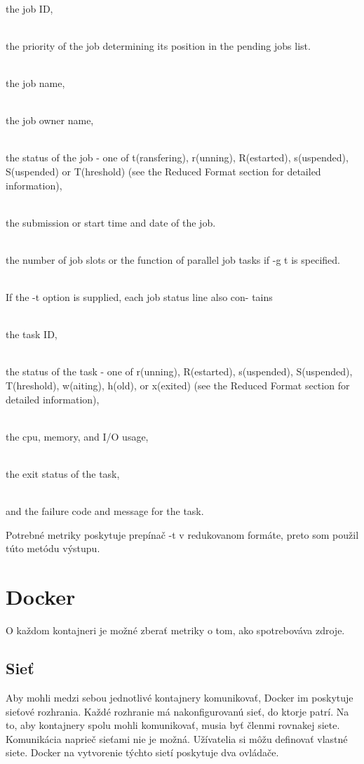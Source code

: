 \documentclass[11pt,final,oneside]{fithesis}
\begin{document}
\begin{description}
     \\  the job ID,

     \\  the priority of the job determining its position  in  the
        pending  jobs  list.  

     \\  the job name,

     \\  the job owner name,

     \\  the status of the job - one of t(ransfering),  r(unning),
        R(estarted), s(uspended), S(uspended) or T(hreshold) (see
        the Reduced Format section for detailed information),

     \\  the submission or start time and date of the job.

     \\  the number of job slots or the function of  parallel  job
        tasks if -g t is specified.


     \\If the -t option is supplied, each job status line also con-
     tains

     \\  the task ID,

     \\  the status of the task - one of  r(unning),  R(estarted),
        s(uspended), S(uspended), T(hreshold), w(aiting), h(old),
        or x(exited) (see the Reduced Format section for detailed
        information),

     \\  the cpu, memory, and I/O usage,

     \\  the exit status of the task,

     \\  and the failure code and message for the task.

\end{description}
 
Potrebné metriky poskytuje prepínač -t v redukovanom formáte, preto som použil túto metódu výstupu.

\section{Docker}
O každom kontajneri je možné zberať metriky o tom, ako spotrebováva zdroje.
\subsection{Sieť}
Aby mohli medzi sebou jednotlivé kontajnery komunikovať, Docker im poskytuje sieťové rozhrania. Každé rozhranie má nakonfigurovanú sieť,
do ktorje patrí. Na to, aby kontajnery spolu mohli komunikovať, musia byť členmi rovnakej siete. Komunikácia naprieč sieťami nie je možná.
Užívatelia si môžu definovať vlastné siete. Docker na vytvorenie týchto sietí poskytuje dva ovládače.
\end{document}
